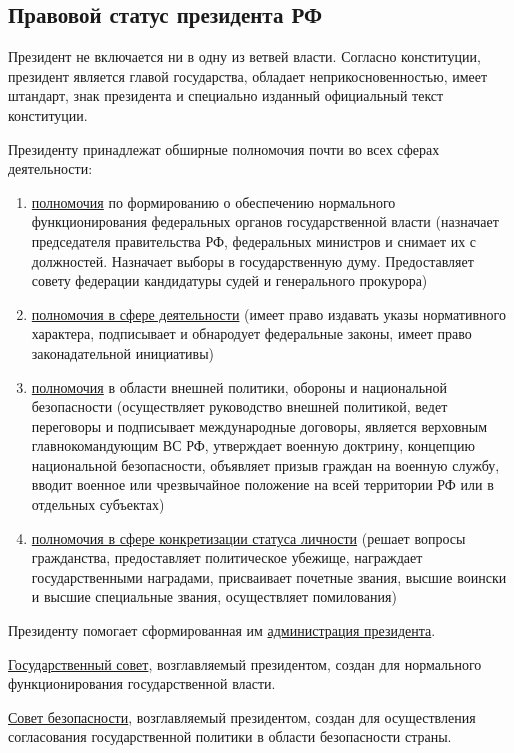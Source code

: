 \documentclass[a5paper,10pt]{article}
\begin{document}
		\subsection{Правовой статус президента РФ}
			Президент не включается ни в одну из ветвей власти. Согласно конституции, президент является главой государства, обладает неприкосновенностью, имеет штандарт, знак президента и специально изданный официальный текст конституции.

			Президенту принадлежат обширные полномочия почти во всех сферах деятельности:
			\begin{enumerate}
				\item \underline{полномочия} по формированию о обеспечению нормального функционирования федеральных органов государственной власти (назначает председателя правительства РФ, федеральных министров и снимает их с должностей. Назначает выборы в государственную думу. Предоставляет совету федерации кандидатуры судей и генерального прокурора)

				\item \underline{полномочия в сфере деятельности} (имеет право издавать указы нормативного характера, подписывает и обнародует федеральные законы, имеет право законадательной инициативы)

				\item \underline{полномочия} в области внешней политики, обороны и национальной безопасности (осуществляет руководство внешней политикой, ведет переговоры и подписывает международные договоры, является верховным главнокомандующим ВС РФ, утверждает военную доктрину, концепцию национальной безопасности, объявляет призыв граждан на военную службу, вводит военное или чрезвычайное положение на всей территории РФ или в отдельных субъектах)

				\item \underline{полномочия в сфере конкретизации статуса личности} (решает вопросы гражданства, предоставляет политическое убежище, награждает государственными наградами, присваивает почетные звания, высшие воински и высшие специальные звания, осуществляет помилования)
			\end{enumerate}

			Президенту помогает сформированная им \underline{администрация президента}.
			
			\underline{Государственный совет}, возглавляемый президентом, создан для нормального функционирования государственной власти.

			\underline{Совет безопасности}, возглавляемый президентом, создан для осуществления согласования государственной политики в области безопасности страны.
\end{document}
